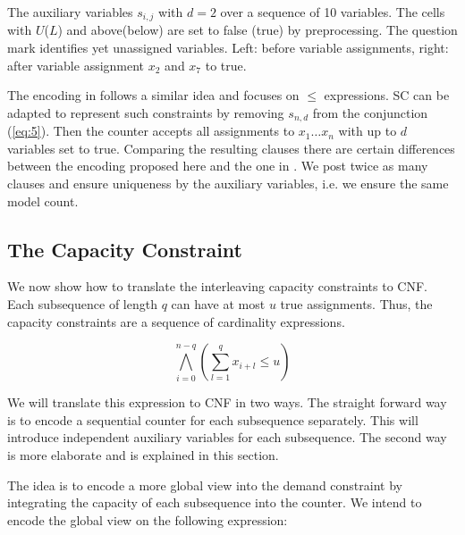 \documentclass[]{llncs}
\begin{document}
\begin{example}
The auxiliary variables $s_{i,j}$ with $d=2$ over a sequence of 10 variables. The cells with  $U$($L$) and
above(below) are set to false (true) by preprocessing. The question mark identifies yet unassigned variables. Left:
before variable assignments, right: after variable assignment $x_2$ and $x_7$ to true.
\begin{center}
\begin{minipage}[t]{0.5\textwidth}

\end{minipage}%
\begin{minipage}[t]{0.5\textwidth}

\end{minipage}
\end{center}
\label{ex:1}
\end{example}

The encoding in \cite{Sinz05} follows a similar idea and focuses on $\leq$ expressions. SC can be adapted to represent
such constraints by removing $s_{n,d}$ from the conjunction (\ref{eq:5}). Then the counter accepts all assignments to
$x_1 \ldots x_n$ with up to $d$ variables set to true. Comparing the resulting clauses there are certain differences
between the encoding proposed here and the one in \cite{Sinz05}. We post twice as many clauses and ensure uniqueness by
the auxiliary variables, i.e. we ensure the same model count. 

\subsection{The Capacity Constraint}

We now show how to translate the interleaving capacity constraints to CNF. Each subsequence of length $q$ can have at
most $u$ true assignments. Thus, the capacity constraints are a sequence of cardinality expressions. 

$$\bigwedge_{i=0}^{n-q}(\sum_{l=1}^q x_{i+l} \leq u )$$

We will translate this expression to CNF in two ways. The straight forward way is to encode a sequential counter for
each subsequence separately. This will introduce independent auxiliary variables for each subsequence. The second way is
more elaborate and is explained in this section.

The idea is to encode a more global view into the demand constraint by integrating the capacity of each subsequence into
the counter. We intend to encode the global view on the following expression: 
\end{document}

